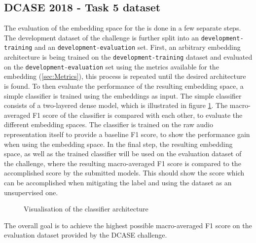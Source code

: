 \subsection{DCASE 2018 - Task 5 dataset}
\label{sub:Eval-DCASE}
The evaluation of the embedding space for the  is done in a few separate steps. The development dataset of the challenge is further split into an \texttt{development-training} and an \texttt{development-evaluation} set. First, an arbitrary embedding architecture is being trained on the \texttt{development-training} dataset and evaluated on the \texttt{development-evaluation} set using the metrics available for the embedding (\ref{sec:Metrics}), this process is repeated until the desired architecture is found.
\newline
\newline
To then evaluate the performance of the resulting embedding space, a simple classifier is trained using the embeddings as input. The simple classifier consists of a two-layered dense model, which is illustrated in figure \ref{fig:Classifier-DCASE-Visualisation}. The macro-averaged F1 score of the classifier is compared with each other, to evaluate the different embedding spaces. The classifier is trained on the raw audio representation itself to provide a baseline F1 score, to show the performance gain when using the embedding space.
\newline
\newline
In the final step, the resulting embedding space, as well as the trained classifier will be used on the evaluation dataset of the challenge, where the resulting macro-averaged F1 score is compared to the accomplished score by the submitted models. This should show the score which can be accomplished when mitigating the label and using the dataset as an unsupervised one.

\begin{figure}[htbp]
    \captionsetup{format=plain}
    \centering
    \caption{Visualisation of the classifier architecture}
    \label{fig:Classifier-DCASE-Visualisation}
\end{figure}
\noindent
The overall goal is to achieve the highest possible macro-averaged F1 score on the evaluation dataset provided by the DCASE challenge.

